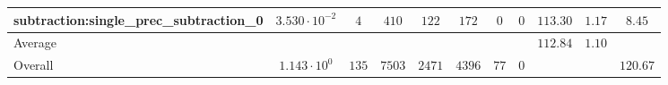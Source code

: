 \begin{tabular}{|l|c|c|c|c|c|c|c|c|c|c|}
subtraction:single\_prec\_subtraction\_0         & $ 3.530 \cdot 10^{-2} $ & $ 4      $ & $ 410  $ & $ 122  $ & $ 172   $ & $ 0  $ & $ 0 $ & $ 113.30      $ & $ 1.17    $ & $ 8.45    $ \\
\hline
Average                                          & $                     $ & $        $ & $      $ & $      $ & $       $ & $    $ & $   $ & $ 112.84      $ & $ 1.10    $ & $         $ \\
\hline
Overall                                          & $ 1.143 \cdot 10^{0}  $ & $ 135    $ & $ 7503 $ & $ 2471 $ & $ 4396  $ & $ 77 $ & $ 0 $ & $             $ & $         $ & $ 120.67  $ \\
\hline
\end{tabular}
